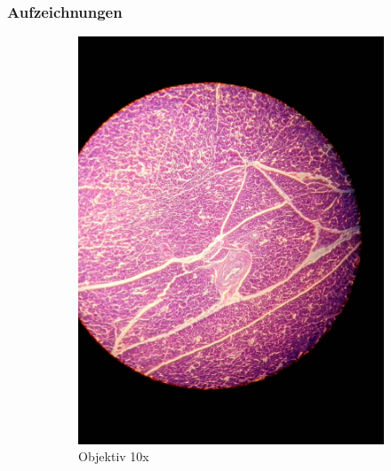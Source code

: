 \subsubsection{Aufzeichnungen}
\begin{figure}[h!]
	\centering
	\begin{subfigure}[b]{0.3\textwidth}
		\includegraphics[width=1\textwidth]{../images/01_pankreas.jpg}
		\caption{Objektiv 10x}
	\end{subfigure}
	\begin{subfigure}[b]{0.3\textwidth}

\end{subfigure}
\end{figure}
